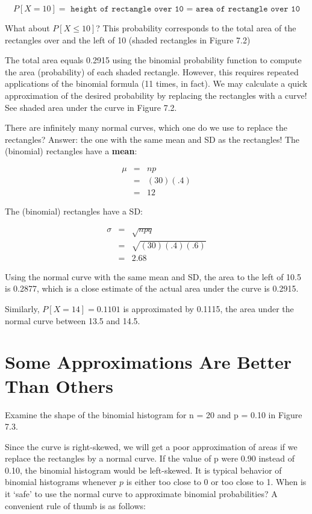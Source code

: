 \documentclass[11pt]{book}\usepackage[]{graphicx}\usepackage[]{color}
\begin{document}
\begin{equation*}
P[X = 10] = \texttt{ height of rectangle over 10 = area of rectangle over 10}
\end{equation*}

What about $P[X \le 10]$?  This probability corresponds to the total area of the rectangles over and the left of 10 (shaded rectangles in Figure 7.2)

The total area equals 0.2915 using the binomial probability function to compute the area (probability) of each shaded rectangle.  However, this requires repeated applications of the binomial formula (11 times, in fact).  We may calculate a quick approximation of the desired probability by replacing the rectangles with a curve!  See shaded area under the curve in Figure 7.2.

There are infinitely many normal curves, which one do we use to replace the rectangles?  Answer: the one with the same mean and SD as the rectangles!  The (binomial) rectangles have a \textbf{mean}:

\begin{eqnarray*}
\mu &=& np \\
  &=& (30)(.4) \\
  &=& 12
\end{eqnarray*}

The (binomial) rectangles have a SD:

\begin{eqnarray*}
\sigma &=& \sqrt{npq} \\
  &=& \sqrt{(30)(.4)(.6)} \\
  &=& 2.68
\end{eqnarray*}

Using the normal curve with the same mean and SD, the area to the left of 10.5 is 0.2877, which is a close estimate of the actual area under the curve is 0.2915.

Similarly, $P[X = 14] = 0.1101$ is approximated by 0.1115, the area under the normal curve between 13.5 and 14.5.

\section{Some Approximations Are Better Than Others}

Examine the shape of the binomial histogram for n = 20 and p = 0.10 in Figure 7.3.

Since the curve is right-skewed, we will get a poor approximation of areas if we replace the rectangles by a normal curve.  If the value of p were 0.90 instead of 0.10, the binomial histogram would be left-skewed.  It is typical behavior of binomial histograms whenever $p$ is either too close to 0 or too close to 1.  When is it `safe' to use the normal curve to approximate binomial probabilities?  A convenient rule of thumb is as follows:
\end{document}
